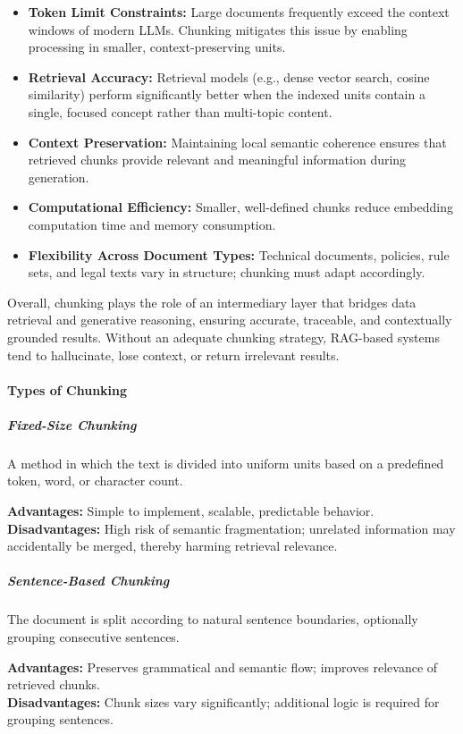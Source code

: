 \documentclass[12pt,a4paper]{article}
\begin{document}
\begin{itemize}
    \item \textbf{Token Limit Constraints:} Large documents frequently exceed the context windows of modern LLMs. Chunking mitigates this issue by enabling processing in smaller, context-preserving units.
    \item \textbf{Retrieval Accuracy:} Retrieval models (e.g., dense vector search, cosine similarity) perform significantly better when the indexed units contain a single, focused concept rather than multi-topic content.
    \item \textbf{Context Preservation:} Maintaining local semantic coherence ensures that retrieved chunks provide relevant and meaningful information during generation.
    \item \textbf{Computational Efficiency:} Smaller, well-defined chunks reduce embedding computation time and memory consumption.
    \item \textbf{Flexibility Across Document Types:} Technical documents, policies, rule sets, and legal texts vary in structure; chunking must adapt accordingly.
\end{itemize}

Overall, chunking plays the role of an intermediary layer that bridges data retrieval and generative reasoning, ensuring accurate, traceable, and contextually grounded results. Without an adequate chunking strategy, RAG-based systems tend to hallucinate, lose context, or return irrelevant results.

\paragraph{Types of Chunking}

\subparagraph{Fixed-Size Chunking}
A method in which the text is divided into uniform units based on a predefined token, word, or character count.

\textbf{Advantages:} Simple to implement, scalable, predictable behavior.\\  
\textbf{Disadvantages:} High risk of semantic fragmentation; unrelated information may accidentally be merged, thereby harming retrieval relevance.

\subparagraph{Sentence-Based Chunking}
The document is split according to natural sentence boundaries, optionally grouping consecutive sentences.

\textbf{Advantages:} Preserves grammatical and semantic flow; improves relevance of retrieved chunks.\\  
\textbf{Disadvantages:} Chunk sizes vary significantly; additional logic is required for grouping sentences.
\end{document}

